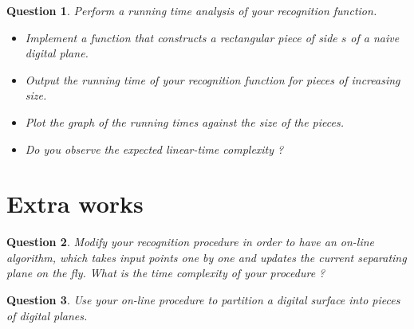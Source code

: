\documentclass[a4paper, 11pt]{article}
\newtheorem{qu}{Question}
\begin{document}
\begin{qu}
  Perform a running time analysis of your recognition function.  
  \begin{itemize}
  \item Implement a function that constructs a rectangular piece of side $s$ of a 
    naive digital plane. 
  \item Output the running time of your recognition function for pieces of increasing size. 
  \item Plot the graph of the running times against the size of the pieces.
  \item Do you observe the expected linear-time complexity ?
  \end{itemize}	 
\end{qu}	

\section{Extra works}

\begin{qu}
Modify your recognition procedure in order to have an on-line algorithm, 
which takes input points one by one 
 and updates the current separating plane on the fly.
What is the time complexity of your procedure ?
\end{qu}

\begin{qu}
Use your on-line procedure to partition a digital surface into pieces of digital planes. 
\end{qu}

\nocite{Seidel1991,Berg2000}


\end{document}
